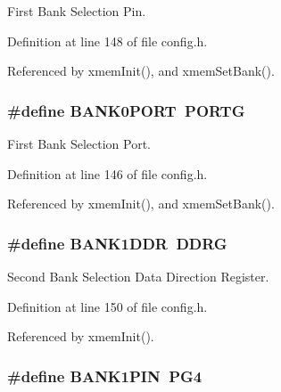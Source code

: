 First Bank Selection Pin. 



Definition at line 148 of file config.\-h.



Referenced by xmem\-Init(), and xmem\-Set\-Bank().

\hypertarget{group__config_gabeec1986c81588dde8863b7936028fc9}{
\subsubsection[{B\-A\-N\-K0\-P\-O\-R\-T}]{\setlength{\rightskip}{0pt plus 5cm}\#define B\-A\-N\-K0\-P\-O\-R\-T~P\-O\-R\-T\-G}}\label{group__config_gabeec1986c81588dde8863b7936028fc9}


First Bank Selection Port. 



Definition at line 146 of file config.\-h.



Referenced by xmem\-Init(), and xmem\-Set\-Bank().

\hypertarget{group__config_gada13cb9312072b48628763a6e1fd50d3}{
\subsubsection[{B\-A\-N\-K1\-D\-D\-R}]{\setlength{\rightskip}{0pt plus 5cm}\#define B\-A\-N\-K1\-D\-D\-R~D\-D\-R\-G}}\label{group__config_gada13cb9312072b48628763a6e1fd50d3}


Second Bank Selection Data Direction Register. 



Definition at line 150 of file config.\-h.



Referenced by xmem\-Init().

\hypertarget{group__config_gacfebedc2067e3c52e6ae1f627afcc1e1}{
\subsubsection[{B\-A\-N\-K1\-P\-I\-N}]{\setlength{\rightskip}{0pt plus 5cm}\#define B\-A\-N\-K1\-P\-I\-N~P\-G4}}\label{group__config_gacfebedc2067e3c52e6ae1f627afcc1e1}


